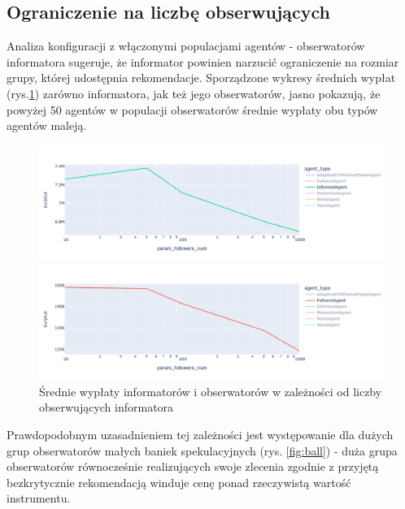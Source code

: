 \subsection{Ograniczenie na liczbę obserwujących}
Analiza konfiguracji z włączonymi populacjami agentów - obserwatorów informatora sugeruje, że informator powinien narzucić ograniczenie na rozmiar grupy, której udostępnia rekomendacje. Sporządzone wykresy średnich wypłat (rys.\ref{fig:followers}) zarówno informatora, jak też jego obserwatorów, jasno pokazują, że powyżej 50 agentów w populacji obserwatorów średnie wypłaty obu typów agentów maleją.
\begin{center}
\begin{figure}
\begin{center}
\includegraphics[scale=0.4]{informer_by_fnum.png}
\end{center}
\begin{center}
\includegraphics[scale=0.4]{follower_by_fnum.png}
\end{center}
\caption{Średnie wypłaty informatorów i obserwatorów w zależności od liczby obserwujących informatora}\label{fig:followers} 
\end{figure}
\end{center}
Prawdopodobnym uzasadnieniem tej zależności jest występowanie dla dużych grup obserwatorów małych baniek spekulacyjnych (rys. \ref{fig:ball}) - duża grupa obserwatorów równocześnie realizujących swoje zlecenia zgodnie z przyjętą bezkrytycznie rekomendacją winduje cenę ponad rzeczywistą wartość instrumentu.
